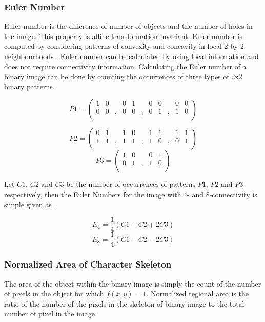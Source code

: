 \documentclass[12pt,a4paper,oneside]{article}
\numberwithin{equation}{section}
\numberwithin{algorithm}{section}
\begin{document}
\subsubsection{Euler Number}
\label{euler_number}
Euler number is the difference of number of objects and the number of holes in the image. This property is affine transformation invariant. Euler number is computed by considering patterns of convexity and concavity in local 2-by-2 neighbourhoods \cite{Pratt1991}. Euler number can be calculated by using local information and does not require connectivity information. Calculating the Euler number of a binary image can be done by counting the occurrences of three types of 2x2 binary patterns.

%
$$ P1=
\left(
\begin{array}{ccccccccccc}
 1 & 0 &  & 0 & 1 &  & 0 & 0 &  & 0 & 0 \\
 0 & 0 &, & 0 & 0 &, & 0 & 1 &, & 1 & 0 \\
\end{array}
\right)
$$

$$ P2=
\left(
\begin{array}{ccccccccccc}
 0 & 1 &  & 1 & 0 &  & 1 & 1 &  & 1 & 1 \\
 1 & 1 &, & 1 & 1 &, & 1 & 0 &, & 0 & 1 \\
\end{array}
\right)
$$
$$ P3=
\left(
\begin{array}{ccccc}
1&0& &0&1 \\
0&1&,&1&0 \\
\end{array}
\right)
$$



Let $C1$, $C2$ and $C3$ be the number of occurrences of patterns $P1$, $P2$ and $P3$ respectively, then the Euler Numbers for the image with 4- and 8-connectivity is simple given as \cite{Pratt1991},

\begin{equation}
E_4=\frac{1}{4}(C1-C2+2C3)
\end{equation}
\begin{equation}
E_8=\frac{1}{4}(C1-C2-2C3)
\end{equation}

\subsubsection{Normalized Area of Character Skeleton}
\label{area}
The area of the object within the binary image is simply the count of the number of pixels in the object for which $ f(x,y)=1 $. Normalized regional area is the ratio of the number of the pixels in the skeleton of binary image to the total number of pixel in the image.
\end{document}
